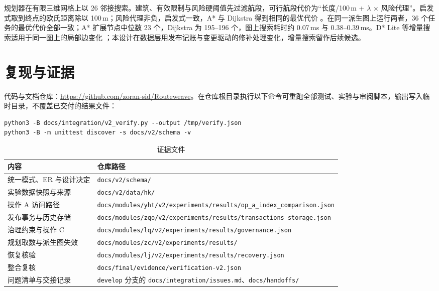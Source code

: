 \documentclass[a4paper,11pt,UTF8]{ctexart}
\begin{document}
规划器在有限三维网格上以 26 邻接搜索。建筑、有效限制与风险硬阈值先过滤航段，可行航段代价为“长度/100\,m + $\lambda$ × 风险代理”。启发式取到终点的欧氏距离除以 100\,m；风险代理非负，启发式一致，A* 与 Dijkstra 得到相同的最优代价 \cite{dijkstra,astar}。在同一派生图上运行两者，36 个任务的最优代价全部一致；A* 扩展节点中位数 23 个，Dijkstra 为 195–196 个，图上搜索耗时约 0.07\,ms 与 0.38–0.39\,ms。D* Lite 等增量搜索适用于同一图上的局部边变化 \cite{dstar}；本设计在数据层用发布记账与变更驱动的修补处理变化，增量搜索留作后续候选。

\section{复现与证据}

代码与文档仓库：\url{https://github.com/zoran-sid/Routeweave}。在仓库根目录执行以下命令可重跑全部测试、实验与审阅脚本，输出写入临时目录，不覆盖已交付的结果文件：

\begin{verbatim}
python3 -B docs/integration/v2_verify.py --output /tmp/verify.json
python3 -B -m unittest discover -s docs/v2/schema -v
\end{verbatim}

\begin{table}[H]\centering\small
\caption{证据文件}
\begin{tabularx}{\textwidth}{L{4.2cm}Y}
\toprule
内容 & 仓库路径 \\
\midrule
统一模式、ER 与设计决定 & \nolinkurl{docs/v2/schema/} \\
实验数据快照与来源 & \nolinkurl{docs/v2/data/hk/} \\
操作 A 访问路径 & \nolinkurl{docs/modules/yht/v2/experiments/results/op_a_index_comparison.json} \\
发布事务与历史存储 & \nolinkurl{docs/modules/zqo/v2/experiments/results/transactions-storage.json} \\
治理约束与操作 C & \nolinkurl{docs/modules/lq/v2/experiments/results/governance.json} \\
规划取数与派生图失效 & \nolinkurl{docs/modules/zc/v2/experiments/results/} \\
恢复核验 & \nolinkurl{docs/modules/lj/v2/experiments/results/recovery.json} \\
整合复核 & \nolinkurl{docs/final/evidence/verification-v2.json} \\
问题清单与交接记录 & \texttt{develop} 分支的 \nolinkurl{docs/integration/issues.md}、\nolinkurl{docs/handoffs/} \\
\bottomrule
\end{tabularx}
\end{table}
\end{document}
